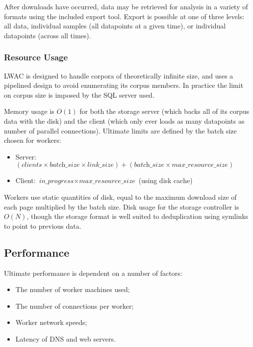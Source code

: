 After downloads have occurred, data may be retrieved for analysis in a variety of formats using the included export tool.  Export is possible at one of three levels: all data, individual samples (all datapoints at a given time), or individual datapoints (across all times).





\subsubsection{Resource Usage}

LWAC is designed to handle corpora of theoretically infinite size, and uses a pipelined design to avoid enumerating its corpus members.  In practice the limit on corpus size is imposed by the SQL server used.

Memory usage is $O(1)$ for both the storage server (which backs all of its corpus data with the disk) and the client (which only ever loads as many datapoints as number of parallel connections).  Ultimate limits are defined by the batch size chosen for workers:

\begin{itemize}
    \item Server: $(\textit{clients} \times \textit{batch\_size} \times \textit{link\_size}) + (\textit{batch\_size} \times \textit{max\_resource\_size})$
    \item Client: $\textit{in\_progress} \times \textit{max\_resource\_size}$ (using disk cache)
\end{itemize}

Workers use static quantities of disk, equal to the maximum download size of each page multiplied by the batch size.  Disk usage for the storage controller is $O(N)$,  though the storage format is well suited to deduplication using symlinks to point to previous data.


\subsection{Performance}
Ultimate performance is dependent on a number of factors:

\begin{itemize}
    \item The number of worker machines used;
    \item The number of connections per worker;
    \item Worker network speeds;
    \item Latency of DNS and web servers.
\end{itemize}

